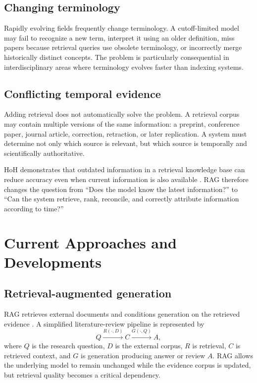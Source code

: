 \documentclass[manuscript,screen]{acmart}
\begin{document}
\subsection{Changing terminology}\label{subsec:terminology}
Rapidly evolving fields frequently change terminology. A cutoff-limited model may fail to recognize a new
term, interpret it using an older definition, miss papers because retrieval queries use obsolete terminology,
or incorrectly merge historically distinct concepts. The problem is particularly consequential in
interdisciplinary areas where terminology evolves faster than indexing systems.

\subsection{Conflicting temporal evidence}\label{subsec:conflict}
Adding retrieval does not automatically solve the problem. A retrieval corpus may contain multiple versions of
the same information: a preprint, conference paper, journal article, correction, retraction, or later replication.
A system must determine not only which source is relevant, but which source is temporally and scientifically
authoritative.

HoH demonstrates that outdated information in a retrieval knowledge base can reduce accuracy even when
current information is also available \cite{ouyang2025}. RAG therefore changes the question from ``Does the
model know the latest information?'' to ``Can the system retrieve, rank, reconcile, and correctly attribute
information according to time?''

\section{Current Approaches and Developments}\label{sec:approaches}

\subsection{Retrieval-augmented generation}\label{subsec:rag}
RAG retrieves external documents and conditions generation on the retrieved evidence \cite{lewis2020}. A
simplified literature-review pipeline is represented by
\begin{equation}
    Q \xrightarrow{R(\cdot,D)} C \xrightarrow{G(\cdot,Q)} A,
    \label{eq:rag-pipeline}
\end{equation}
where $Q$ is the research question, $D$ is the external corpus, $R$ is retrieval, $C$ is retrieved context,
and $G$ is generation producing answer or review $A$. RAG allows the underlying model to remain unchanged
while the evidence corpus is updated, but retrieval quality becomes a critical dependency.
\end{document}
